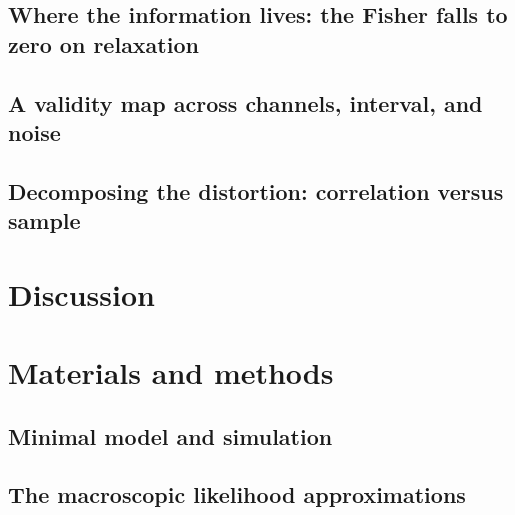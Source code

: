 \documentclass[9pt]{elife}
\begin{document}
\subsection*{Where the information lives: the Fisher falls to zero on relaxation}

\subsection*{A validity map across channels, interval, and noise}

\subsection*{Decomposing the distortion: correlation versus sample}

\section*{Discussion}

\section*{Materials and methods}

\subsection*{Minimal model and simulation}
\subsection*{The macroscopic likelihood approximations}
\end{document}
